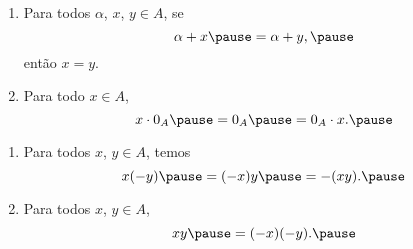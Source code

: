 \documentclass{beamer}
\begin{document}
    \begin{frame}
        \begin{proposicao}
            \begin{enumerate}[label={\roman*})]
                \conti
                
                \item Para todos $\alpha$, \pause $x$, \pause $y \in A$, \pause se
                \[
                    \alpha + x \pause = \alpha + y,\pause
                \]
                ent{\~a}o $x = y$.\pause

                \vspace{.5cm}
                
                \item Para todo $x \in A$, \pause 
                \[
                    x\cdot 0_A \pause = 0_A \pause = 0_A\cdot x.\pause
                \]

                \vspace{.5cm}
            \end{enumerate}
        \end{proposicao}
    \end{frame}

    \begin{frame}
        \begin{proposicao}
            \begin{enumerate}[label={\roman*})]
                \conti

                \item Para todos $x$, \pause $y \in A$, \pause temos\pause
                \[
                    x(-y) \pause = (-x)y \pause = -(xy).\pause
                \]

                \vspace{.5cm}
                
                \item Para todos $x$, \pause $y \in A$, \pause
                \[
                    xy \pause = (-x)(-y).\pause
                \]

                \vspace{.5cm}
            \end{enumerate}
        \end{proposicao}
    \end{frame}
\end{document}
